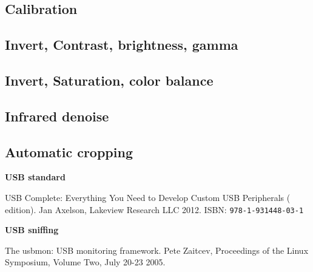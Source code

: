 \documentclass{article}
\begin{document}
\subsection{Calibration}

\subsection{Invert, Contrast, brightness, gamma}

\subsection{Invert, Saturation, color balance}

\subsection{Infrared denoise}

\subsection{Automatic cropping}

\pagebreak

\renewcommand{\refname}{References}
\begin{thebibliography}{}

  \item[]\hspace{-\labelwidth}\hspace{-\labelsep}\textbf{USB standard}

   USB Complete: Everything You Need to Develop
               Custom USB Peripherals ( edition).
               Jan Axelson, Lakeview Research LLC 2012.
               ISBN: {\tt   978-1-931448-03-1}
               
  \item[]\hspace{-\labelwidth}\hspace{-\labelsep}\textbf{USB sniffing}
  
   The usbmon: USB monitoring framework. Pete Zaitcev,
  Proceedings of the Linux Symposium, Volume Two, July 20-23 2005.
  \setcounter{firstbib}{\value{enumiv}}
\end{thebibliography}
\end{document}
